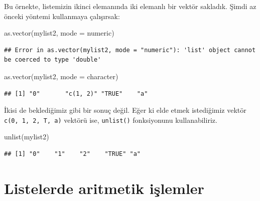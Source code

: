 \documentclass[
]{book}
\newenvironment{Shaded}{\begin{snugshade}}{\end{snugshade}}
\newcommand{\AttributeTok}[1]{\textcolor[rgb]{0.77,0.63,0.00}{#1}}
\newcommand{\FunctionTok}[1]{\textcolor[rgb]{0.00,0.00,0.00}{#1}}
\newcommand{\NormalTok}[1]{#1}
\newcommand{\StringTok}[1]{\textcolor[rgb]{0.31,0.60,0.02}{#1}}
\begin{document}
Bu örnekte, listemizin ikinci elemanında iki elemanlı bir vektör sakladık. Şimdi az önceki yöntemi kullanmaya çalışırsak:

\begin{Shaded}
\begin{Highlighting}[]
\FunctionTok{as.vector}\NormalTok{(mylist2, }\AttributeTok{mode =} \StringTok{\textquotesingle{}numeric\textquotesingle{}}\NormalTok{)}
\end{Highlighting}
\end{Shaded}

\begin{verbatim}
## Error in as.vector(mylist2, mode = "numeric"): 'list' object cannot be coerced to type 'double'
\end{verbatim}

\begin{Shaded}
\begin{Highlighting}[]
\FunctionTok{as.vector}\NormalTok{(mylist2, }\AttributeTok{mode =} \StringTok{\textquotesingle{}character\textquotesingle{}}\NormalTok{)}
\end{Highlighting}
\end{Shaded}

\begin{verbatim}
## [1] "0"       "c(1, 2)" "TRUE"    "a"
\end{verbatim}

İkisi de beklediğimiz gibi bir sonuç değil. Eğer ki elde etmek istediğimiz vektör \texttt{c(\textquotesingle{}0\textquotesingle{},\ \textquotesingle{}1\textquotesingle{},\ \textquotesingle{}2\textquotesingle{},\ \textquotesingle{}T\textquotesingle{},\ \textquotesingle{}a\textquotesingle{})} vektörü ise, \texttt{unlist()} fonksiyonunu kullanabiliriz.

\begin{Shaded}
\begin{Highlighting}[]
\FunctionTok{unlist}\NormalTok{(mylist2)}
\end{Highlighting}
\end{Shaded}

\begin{verbatim}
## [1] "0"    "1"    "2"    "TRUE" "a"
\end{verbatim}

\hypertarget{listelerde-aritmetik-iux15flemler}{%
\section{Listelerde aritmetik işlemler}\label{listelerde-aritmetik-iux15flemler}}
\end{document}
